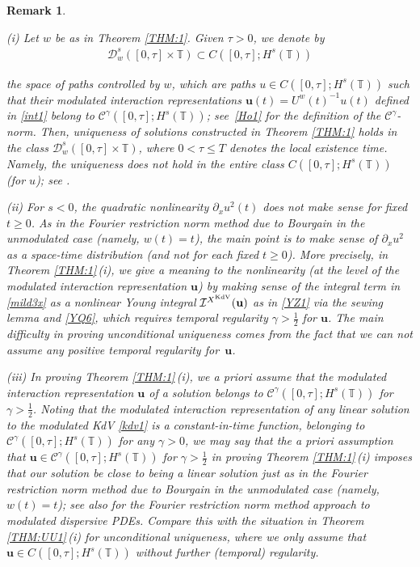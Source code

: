 \documentclass[letterpaper, 11pt,  reqno]{amsart}
\newtheorem{remark}[theorem]{Remark}
\newcommand{\1}{\hspace{0.5mm}\text{I}\hspace{0.5mm}}
\newcommand{\I}{\mathcal{I}}
\newcommand{\noi}{\noindent}
\newcommand{\T}{\mathbb{T}}
\newcommand{\CC}{\mathcal{C}}
\newcommand{\g}{\gamma}
\newcommand{\dx}{\partial_x}
\newcommand{\cD}{\mathscr{D}}
\newcommand{\uw}{U^w}
\newcommand{\uu}{\mathbf{u}}
\newcommand{\KDV}{\text{\rm KdV} }
\numberwithin{equation}{section}
\numberwithin{theorem}{section}
\begin{document}
\begin{remark}\label{REM:control}\rm


(i)
Let $w$ be as in Theorem \ref{THM:1}.
Given $\tau > 0$, we
denote by 
\begin{align*}
 \cD_{w}^s([0, \tau] \times \T) \subset C([0, \tau];H^s(\T))
\end{align*}


\noi
the space of {\it paths controlled by $w$}, 
which are 
 paths $u \in C([0, \tau];H^s(\T))$ 
such that 
their modulated interaction representations 
$\uu(t)=\uw(t)^{-1}u(t)$
defined in \eqref{int1}
belong
to  $\CC^{\g}([0, \tau];H^s(\T))$; see~\eqref{Ho1}
for the definition of the $\CC^\g$-norm.
Then, 
uniqueness of solutions constructed in Theorem \ref{THM:1}
holds 
 in the class $\cD_{w}^s([0, \tau] \times \T)$, 
 where 
  $0 < \tau \le  T$ denotes the local existence time.
Namely, the uniqueness
does {\it not} hold
in the entire class 
$C([0, \tau];H^s(\T))$ (for $u$);
see \cite[Remark 1.4]{CGLLO1}.

\smallskip


\noi
(ii)
For $s < 0$, the quadratic nonlinearity $\dx u^2(t)$ does not make 
sense for fixed $t \ge0$.
As in the Fourier restriction norm method due to Bourgain \cite{BO93}
in the unmodulated case (namely, $w(t) = t$), 
the main point is to make sense of 
$\dx u^2$ as a space-time distribution
(and not for each fixed $t \ge 0$).
More precisely, in Theorem \ref{THM:1}\,(i), 
we give a meaning to  the nonlinearity (at the level 
of the modulated interaction representation $\uu$)
by making sense of 
the integral term
in 
\eqref{mild3x}
as a nonlinear Young integral
$\I^{X^\KDV}(\uu) $
as in \eqref{YZ1}
via the sewing lemma and \eqref{YQ6}, 
which requires temporal regularity $\g > \frac 12$
for $\uu$.
The main difficulty in proving unconditional uniqueness
comes from the
fact that we can {\it not} assume any positive temporal regularity
for~$\uu$.


\smallskip


\noi
(iii)
In proving Theorem \ref{THM:1}\,(i), 
we {\it a priori} assume that 
the modulated interaction representation $\uu$ of a solution 
belongs to $\CC^\g([0, \tau]; H^s(\T))$ for $\g > \frac 12$.
Noting that 
the modulated interaction representation  of 
any linear solution to the modulated KdV \eqref{kdv1}
is a constant-in-time function, belonging
to $\CC^\g([0, \tau]; H^s(\T))$ for any $\g > 0$, 
we may say that 
the a priori assumption
that 
$\uu \in \CC^\g([0, \tau]; H^s(\T))$ for $\g > \frac 12$
in proving Theorem \ref{THM:1}\,(i)
imposes that our solution be close to being a linear solution
just as in the Fourier restriction norm method due to Bourgain \cite{BO93}
in the unmodulated case (namely, $w(t) = t$);
see also \cite{Robert2, Robert3}
for the Fourier restriction norm method approach
to modulated dispersive PDEs.
Compare this with the situation in Theorem \ref{THM:UU1}\,(i)
for unconditional uniqueness, 
where we only assume that 
$\uu \in C([0, \tau]; H^s(\T))$
without further (temporal) regularity.



\end{remark}
\end{document}

